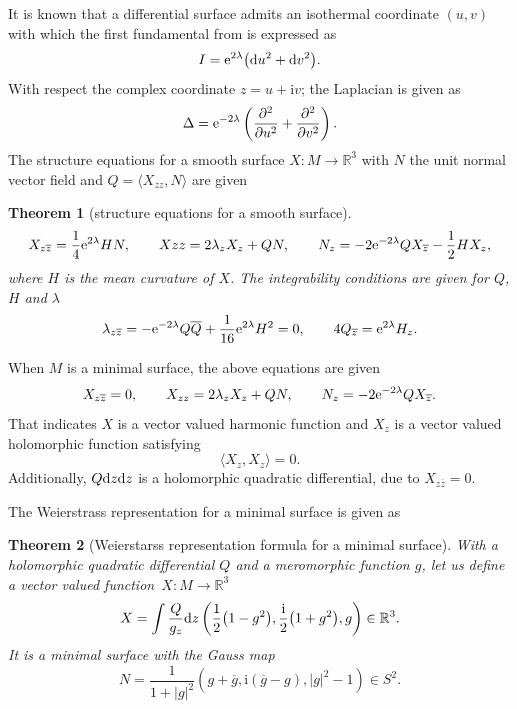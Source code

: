 \documentclass[pdftex]{sigma}
\newcommand{\R}{\mathbb{R}}
\newcommand{\ii}{{\mathrm{i}}}
\let\Re\relax
\DeclareMathOperator{\Re}{Re}
\let\Re\relax
\DeclareMathOperator{\Re}{{\mathrm Re}}
\newcommand{\1}{{\bf 1}}
\newcommand{\pd}{\partial}
\newcommand{\nai}{\langle}
\newcommand{\seki}{\rangle}
\numberwithin{equation}{section}
\newtheorem{Theorem}{Theorem}[section]
\begin{document}
It is known that a differential surface admits an isothermal coordinate $(u,v)$ with which the first fundamental from is expressed as
\begin{gather*}
 I ={\rm e}^{2\lambda}\big({\rm d}u^2+ {\rm d}v^2\big).
\end{gather*}
With respect the complex coordinate $z=u+\ii v$; the Laplacian is given as
\begin{gather*}
 \Delta = {\rm e}^{-2\lambda} \left( \frac{\pd^2}{\pd u^2} + \frac{\pd^2}{\pd v^2}\right).
\end{gather*}
The structure equations for a smooth surface $X\colon M \to \R^3$ with $N$ the unit normal vector field
and $Q = \nai X_{zz}, N \seki$ are given
\begin{Theorem}[structure equations for a smooth surface]
 \[
 X_{z \overline{z}}= \frac{1}{4} {\rm e}^{2\lambda}H N, \qquad
 X{zz} = 2 \lambda_{z}X_z + QN, \qquad
 N_z = -2 {\rm e}^{-2\lambda}Q X_{\overline{z}} - \frac{1}{2} HX_z,
 \]
 where $H$ is the mean curvature of $X$.
 The integrability conditions are given for $Q$, $H$ and $\lambda$
 \[
 \lambda_{z\overline{z}}=-{\rm e}^{-2\lambda} Q \overline{Q} + \frac{1}{16} {\rm e}^{2\lambda}H^2 =0, \qquad
 4Q_{\overline{z}} = {\rm e}^{2\lambda} H_z.
 \]
\end{Theorem}
When $M$ is a minimal surface, the above equations are given
\[
 X_{z\overline{z}}=0,\qquad
 X_{zz} = 2\lambda_z X_z + QN,\qquad
 N_z = -2{\rm e}^{-2\lambda}Q X_{\overline{z}}.
\]
That indicates $X$ is a vector valued harmonic function and
$X_z$ is a vector valued holomorphic function satisfying
\begin{displaymath}
 \nai X_z, X_z \seki = 0.
\end{displaymath}
Additionally, $Q{\rm d}z{\rm d}z$ is a holomorphic quadratic differential,
due to $X_{z\overline{z}}=0$.

The Weierstrass representation for a minimal surface is given as
\begin{Theorem}[Weierstarss representation formula for a minimal surface]
 With a holomorphic quadratic differential $Q$ and a meromorphic function $g$, let us define
 a vector valued function~${X\colon M \to \R^3}$
 \begin{displaymath}
 X = \Re \int \frac{Q}{g_z}{\rm d}z
 \left(
 \frac{1}{2}\big(1-g^2\big), \frac{\ii}{2}\big(1+g^2\big), g
 \right)
 \in \R^3.
 \end{displaymath}
 It is a minimal surface with the Gauss map
 \begin{displaymath}
 N = \frac{1}{1+|g|^2}\left(g+\overline{g}, \ii (\overline{g}-g), |g|^2-1 \right) \in S^2.
 \end{displaymath}
\end{Theorem}
\end{document}
